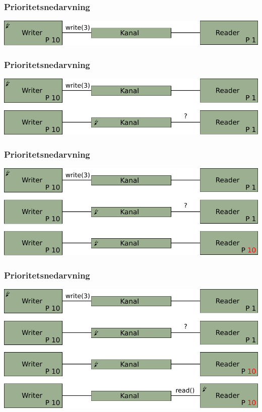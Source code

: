 \documentclass[12pt]{beamer}
\begin{document}
\begin{frame}[t]
  \frametitle{Prioritetsnedarvning}
\vspace{1.2cm}
\includegraphics[scale=0.7]{nedarvning} 
\end{frame}
\begin{frame}[t]
  \frametitle{Prioritetsnedarvning}
\vspace{1.2cm}
\includegraphics[scale=0.7]{nedarvning2} 
\end{frame}
\begin{frame}[t]
  \frametitle{Prioritetsnedarvning}
\vspace{1.2cm}
\includegraphics[scale=0.7]{nedarvning3} 
\end{frame}
\begin{frame}[t]
  \frametitle{Prioritetsnedarvning}
\vspace{1.2cm}
\includegraphics[scale=0.7]{nedarvning4} 
\end{frame}
\end{document}
